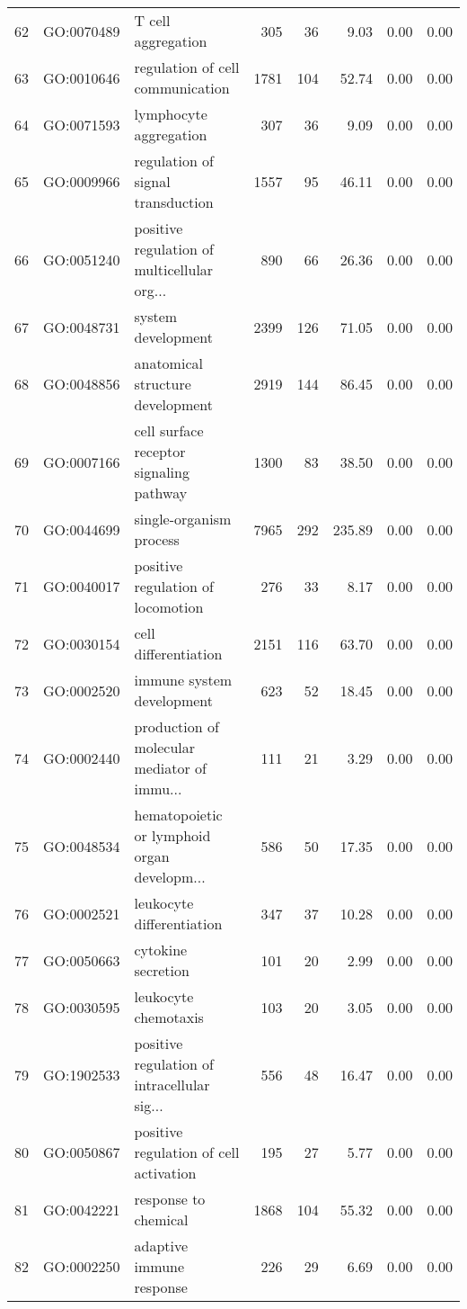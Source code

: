 \begin{table}[ht]
\begin{tabular}{rllrrrrr}
  62 & GO:0070489 & T cell aggregation & 305 &  36 & 9.03 & 0.00 & 0.00 \\ 
  63 & GO:0010646 & regulation of cell communication & 1781 & 104 & 52.74 & 0.00 & 0.00 \\ 
  64 & GO:0071593 & lymphocyte aggregation & 307 &  36 & 9.09 & 0.00 & 0.00 \\ 
  65 & GO:0009966 & regulation of signal transduction & 1557 &  95 & 46.11 & 0.00 & 0.00 \\ 
  66 & GO:0051240 & positive regulation of multicellular org... & 890 &  66 & 26.36 & 0.00 & 0.00 \\ 
  67 & GO:0048731 & system development & 2399 & 126 & 71.05 & 0.00 & 0.00 \\ 
  68 & GO:0048856 & anatomical structure development & 2919 & 144 & 86.45 & 0.00 & 0.00 \\ 
  69 & GO:0007166 & cell surface receptor signaling pathway & 1300 &  83 & 38.50 & 0.00 & 0.00 \\ 
  70 & GO:0044699 & single-organism process & 7965 & 292 & 235.89 & 0.00 & 0.00 \\ 
  71 & GO:0040017 & positive regulation of locomotion & 276 &  33 & 8.17 & 0.00 & 0.00 \\ 
  72 & GO:0030154 & cell differentiation & 2151 & 116 & 63.70 & 0.00 & 0.00 \\ 
  73 & GO:0002520 & immune system development & 623 &  52 & 18.45 & 0.00 & 0.00 \\ 
  74 & GO:0002440 & production of molecular mediator of immu... & 111 &  21 & 3.29 & 0.00 & 0.00 \\ 
  75 & GO:0048534 & hematopoietic or lymphoid organ developm... & 586 &  50 & 17.35 & 0.00 & 0.00 \\ 
  76 & GO:0002521 & leukocyte differentiation & 347 &  37 & 10.28 & 0.00 & 0.00 \\ 
  77 & GO:0050663 & cytokine secretion & 101 &  20 & 2.99 & 0.00 & 0.00 \\ 
  78 & GO:0030595 & leukocyte chemotaxis & 103 &  20 & 3.05 & 0.00 & 0.00 \\ 
  79 & GO:1902533 & positive regulation of intracellular sig... & 556 &  48 & 16.47 & 0.00 & 0.00 \\ 
  80 & GO:0050867 & positive regulation of cell activation & 195 &  27 & 5.77 & 0.00 & 0.00 \\ 
  81 & GO:0042221 & response to chemical & 1868 & 104 & 55.32 & 0.00 & 0.00 \\ 
  82 & GO:0002250 & adaptive immune response & 226 &  29 & 6.69 & 0.00 & 0.00 \\ 

\end{tabular}
\end{table}
